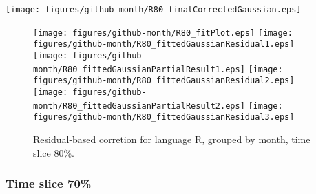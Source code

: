 \begin{center}
{\texttt{[image: figures/github-month/R80\_finalCorrectedGaussian.eps]}}
\end{center}

\FloatBarrier

\begin{figure}[t]
\centering
{}
{\texttt{[image: figures/github-month/R80\_fitPlot.eps]}}
{\texttt{[image: figures/github-month/R80\_fittedGaussianResidual1.eps]}}
{\texttt{[image: figures/github-month/R80\_fittedGaussianPartialResult1.eps]}}
{\texttt{[image: figures/github-month/R80\_fittedGaussianResidual2.eps]}}
{\texttt{[image: figures/github-month/R80\_fittedGaussianPartialResult2.eps]}}
{\texttt{[image: figures/github-month/R80\_fittedGaussianResidual3.eps]}}
\caption{Residual-based corretion for language R, grouped by month, time slice 80\%.}
\end{figure}


\FloatBarrier


\subsubsection{Time slice 70\%}

